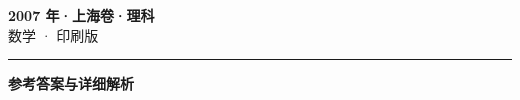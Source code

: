 \documentclass[zihao=5, a4paper]{ctexart}
\begin{document}
\begin{center}
  {\Large\bfseries 2007 年·上海卷·理科}\\[4pt]
  {\large 数学 · 印刷版}
\end{center}
\medskip
{}

\par\bigskip\hrule\bigskip
{}
\begin{center}{\large\bfseries 参考答案与详细解析}\end{center}
\smallskip

\end{document}
